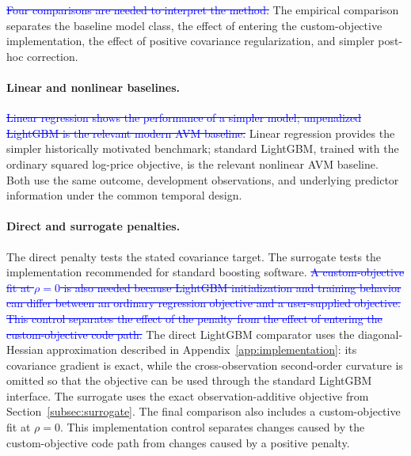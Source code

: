 \documentclass[10pt]{article}
\theoremstyle{definition}
\newcommand{\1}{\mathbf{1}}
\begin{document}
{{\textcolor{blue}{\sout{Four comparisons are needed to interpret the method.}}
\textcolor{impGreen}{The empirical comparison separates the baseline model class, the effect of entering the custom-objective implementation, the effect of positive covariance regularization, and simpler post-hoc correction.}

\paragraph{Linear and nonlinear baselines.}
\textcolor{blue}{\sout{Linear regression shows the performance of a simpler model; unpenalized LightGBM is the relevant modern AVM baseline.}}
\textcolor{impGreen}{Linear regression provides the simpler historically motivated benchmark; standard LightGBM, trained with the ordinary squared log-price objective, is the relevant nonlinear AVM baseline. Both use the same outcome, development observations, and underlying predictor information under the common temporal design.}

\paragraph{Direct and surrogate penalties.}
The direct penalty tests the stated covariance target. The surrogate tests the implementation recommended for standard boosting software.
\textcolor{blue}{\sout{A custom-objective fit at $\rho=0$ is also needed because LightGBM initialization and training behavior can differ between an ordinary regression objective and a user-supplied objective. This control separates the effect of the penalty from the effect of entering the custom-objective code path.}}
\textcolor{impGreen}{The direct LightGBM comparator uses the diagonal-Hessian approximation described in Appendix~\ref{app:implementation}: its covariance gradient is exact, while the cross-observation second-order curvature is omitted so that the objective can be used through the standard LightGBM interface. The surrogate uses the exact observation-additive objective from Section~\ref{subsec:surrogate}. The final comparison also includes a custom-objective fit at $\rho=0$. This implementation control separates changes caused by the custom-objective code path from changes caused by a positive penalty.}

}}
\end{document}
